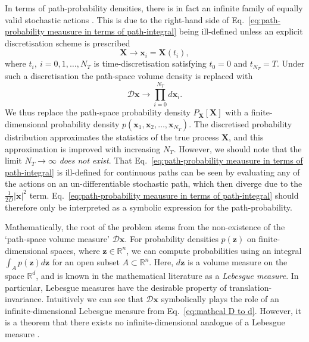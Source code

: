 In terms of path-probability densities, there is in fact an infinite family of equally valid stochastic actions \citep{gladrowExperimentalMeasurementRelative2021}. This is due to the right-hand side of Eq.~\ref{eq:path-probability meausure in terms of path-integral} being ill-defined unless an explicit discretisation scheme is prescribed
\begin{equation}
\mathbf{X} \longrightarrow \mathbf{x}_i = \mathbf{X}(t_i),
\end{equation}
where $t_i,\ i=0, 1, \dots, N_T$ is time-discretisation satisfying $t_0 = 0$ and $t_{N_T} = T$. Under such a discretisation the path-space volume density is replaced with
\begin{equation} \label{eq:mathcal D to d}
\mathcal{D}\mathbf{x} \to \prod_{i=0}^{N_T} d \mathbf{x}_i.
\end{equation}
We thus replace the path-space probability density $P_\mathbf{X}[\mathbf{X}]$ with a finite-dimensional probability density $p(\mathbf{x}_1, \mathbf{x}_2, \dots, \mathbf{x}_{N_T})$. The discretised probability distribution approximates the statistics of the true process $\mathbf{X}$, and this approximation is improved with increasing $N_T$. However, we should note that the limit $N_T \to \infty$ \textit{does not exist}. That Eq.~\ref{eq:path-probability meausure in terms of path-integral} is ill-defined for continuous paths can be seen by evaluating any of the actions on an un-differentiable stochastic path, which then diverge due to the $\frac{1}{2 D} |\dot{\mathbf{x}}|^2$ term. Eq.~\ref{eq:path-probability meausure in terms of path-integral} should therefore only be interpreted as a symbolic expression for the path-probability.

Mathematically, the root of the problem stems from the non-existence of the `path-space volume measure' $\mathcal{D} \mathbf{x}$. For probability densities $p(\mathbf{z})$ on finite-dimensional spaces, where $\mathbf{z} \in \mathbb{R}^n$, we can compute probabilities using an integral $\int_A p(\mathbf{z}) d \mathbf{z}$ for an open subset  $A \subset \mathbb{R}^n$. Here, $d \mathbf{z}$ is a volume measure on the space $\mathbb{R}^d$, and is known in the mathematical literature as a \textit{Lebesgue measure}. In particular, Lebesgue measures have the desirable property of translation-invariance. Intuitively we can see that $\mathcal{D} \mathbf{x}$ symbolically plays the role of an infinite-dimensional Lebesgue measure from Eq.~\ref{eq:mathcal D to d}. However, it is a theorem that there exists no infinite-dimensional analogue of a Lebesgue measure \citep{MeasureIntegrationTheory1972}.

